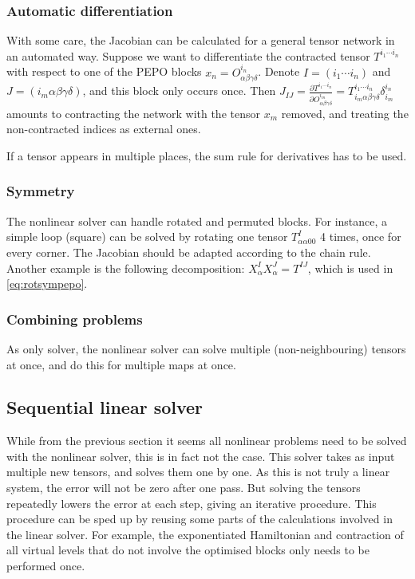 \subsubsection{Automatic differentiation}
With some care, the Jacobian can be calculated for a general tensor network in an automated way. Suppose we want to differentiate the contracted tensor $T^{i_1  \cdots i_n  }$ with respect to one of the PEPO blocks $x_n = O^{i_n }_{\alpha \beta \gamma \delta}$. Denote $I=(i_1 \cdots i_n )$ and $J=(i_m  \alpha \beta \gamma \delta)$, and this block only occurs once. Then $  J_{I J}  = \frac{\partial T^{i_1  \cdots i_n  } }{  \partial O^{i_m }_{\alpha \beta \gamma \delta} } = T^{i_1 \cdots i_n } _{ i_m  \alpha \beta \gamma \delta}  \delta^{i_n}_{i_m}   $  amounts to  contracting the network with the tensor $x_m$ removed, and treating the non-contracted indices as external ones.

If a tensor appears in multiple places, the sum rule for derivatives has to be used.

\subsubsection{Symmetry}

The nonlinear solver can handle rotated and permuted blocks. For instance, a simple loop (square) can be solved by rotating one tensor $T^I_{ \alpha \alpha 0 0}$ 4 times, once for every corner. The Jacobian should be adapted according to the chain rule. Another example is the following decomposition:  $  X^I_\alpha X^J_\alpha = T^{I J} $, which is used in \cref{eq:rotsympepo}.

\subsubsection{Combining problems}
As only solver, the nonlinear solver can solve multiple (non-neighbouring) tensors at once, and do this for multiple maps at once.

\subsection{Sequential linear solver}
While from the previous section it seems all nonlinear problems need to be solved with the nonlinear solver, this is in fact not the case. This solver takes as input multiple new tensors, and solves them one by one. As this is not truly a linear system, the error will not be zero after one pass. But solving the tensors repeatedly lowers the error at each step, giving an iterative procedure. This procedure can be sped up by reusing some parts of the calculations involved in the linear solver. For example, the exponentiated Hamiltonian and contraction of all virtual levels that do not involve the optimised blocks only needs to be performed once.

